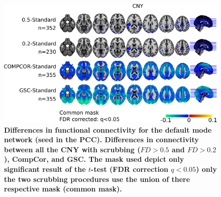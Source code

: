 \documentclass[authoryear]{elsarticle}
\begin{document}
\pagebreak

\begin{figure}[tbp]
\begin{center}
\includegraphics[width=\linewidth]{../figures/figure_comp_cny.pdf}
\end{center}
\caption{
{\bf Differences in functional connectivity for the default mode network (seed in the PCC). Differences in connectivity between all the CNY with scrubbing ($FD>0.5$ and $FD>0.2$), CompCor, and GSC. The mask used depict only significant result of the $t$-test (FDR correction $q<0.05$) only the two scrubbing procedures use the union of there respective mask (common mask).}
}
\label{fig_sup_scrubbimpact_cny}
\end{figure}
\end{document}

